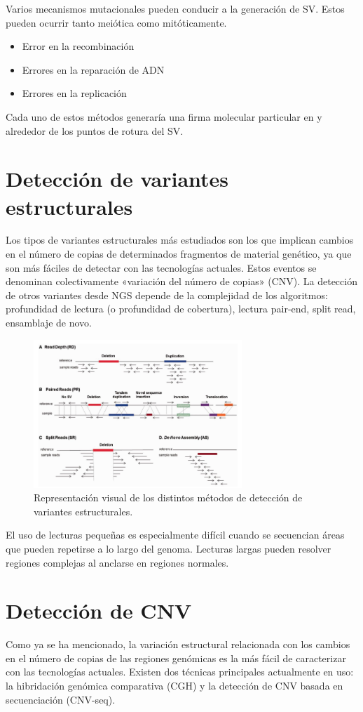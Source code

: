 Varios mecanismos mutacionales pueden conducir a la generación de SV. Estos pueden ocurrir tanto meiótica como mitóticamente.
\begin{itemize}
\item Error en la recombinación
\item Errores en la reparación de ADN 
\item Errores en la replicación
\end{itemize}
Cada uno de estos métodos generaría una firma molecular particular en y alrededor de los puntos de rotura del SV.

\section{Detección de variantes estructurales}
Los tipos de variantes estructurales más estudiados son los que implican cambios en el número de copias de determinados fragmentos de material genético, ya que son más fáciles de detectar con las tecnologías actuales. Estos eventos se denominan colectivamente «variación del número de copias» (CNV). La detección de otros variantes desde NGS depende de la complejidad de los algoritmos: profundidad de lectura (o profundidad de cobertura), lectura pair-end, split read, ensamblaje de novo. 

\begin{figure}[h!]
\centering
\includegraphics[width = 0.7\textwidth]{figs/sv-detection-methods.png}
\caption{Representación visual de los distintos métodos de detección de variantes estructurales.}
\end{figure}

El uso de lecturas pequeñas es especialmente difícil cuando se secuencian áreas que pueden repetirse a lo largo del genoma. Lecturas largas pueden resolver regiones complejas al anclarse en regiones normales. 

\section{Detección de CNV}
Como ya se ha mencionado, la variación estructural relacionada con los cambios en el número de copias de las regiones genómicas es la más fácil de caracterizar con las tecnologías actuales.
Existen dos técnicas principales actualmente en uso: la hibridación genómica comparativa (CGH) y la detección de CNV basada en secuenciación (CNV-seq).

